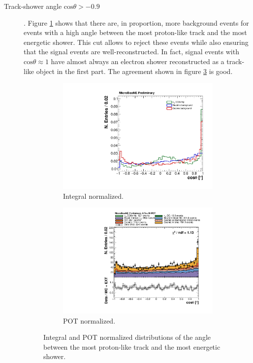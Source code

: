 \begin{description}
\item[Track-shower angle $\mathrm{cos}\theta > -0.9$]. Figure \ref{fig:angle_integral} shows that there are, in proportion, more background events for events with a high angle between the most proton-like track and the most energetic shower. This cut allows to reject these events while also ensuring that the signal events are well-reconstructed. In fact, signal events with $\mathrm{cos}\theta \approx 1$ have almost always an electron shower reconstructed as a track-like object in the first part. The agreement shown in figure \ref{fig:angle_pot} is good.

\begin{figure}[htbp]
\centering
  \begin{subfigure}{0.45\textwidth}
    \includegraphics[width=\linewidth]{figures/h_track_shower_angle_norm.pdf}
    \caption{Integral normalized.} \label{fig:angle_integral}
  \end{subfigure}
    \begin{subfigure}{0.45\textwidth}
    \includegraphics[width=\linewidth]{figures/h_track_shower_angle.pdf}
    \caption{POT normalized.} \label{fig:angle_pot}
  \end{subfigure}
  \caption{Integral and POT normalized distributions of the angle between the most proton-like track and the most energetic shower.}
\end{figure}


\end{description}
